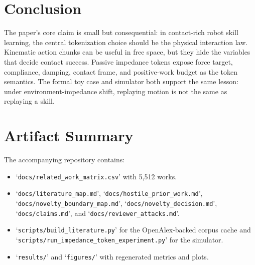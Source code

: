 \documentclass{article}
\begin{document}
\section{Conclusion}

The paper's core claim is small but consequential: in contact-rich robot skill learning, the central tokenization choice should be the physical interaction law. Kinematic action chunks can be useful in free space, but they hide the variables that decide contact success. Passive impedance tokens expose force target, compliance, damping, contact frame, and positive-work budget as the token semantics. The formal toy case and simulator both support the same lesson: under environment-impedance shift, replaying motion is not the same as replaying a skill.




\appendix

\section{Artifact Summary}

The accompanying repository contains:
\begin{itemize}
    \item `\texttt{docs/related\_work\_matrix.csv}' with 5,512 works.
    \item `\texttt{docs/literature\_map.md}', `\texttt{docs/hostile\_prior\_work.md}', `\texttt{docs/novelty\_boundary\_map.md}', `\texttt{docs/novelty\_decision.md}', `\texttt{docs/claims.md}', and `\texttt{docs/reviewer\_attacks.md}'.
    \item `\texttt{scripts/build\_literature.py}' for the OpenAlex-backed corpus cache and `\texttt{scripts/run\_impedance\_token\_experiment.py}' for the simulator.
    \item `\texttt{results/}' and `\texttt{figures/}' with regenerated metrics and plots.
\end{itemize}
\end{document}
